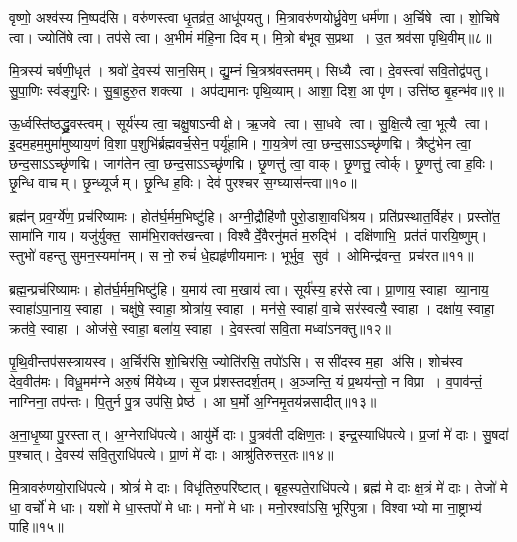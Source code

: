 वृष्णो॒ अश्व॑स्य नि॒ष्पद॑सि। वरु॑णस्त्वा धृ॒तव्र॑त॒ आधू॑पयतु। मि॒त्रावरु॑णयोर्ध्रु॒वेण॒ धर्म॑णा। अ॒र्चिषे त्वा। शो॒चिषे त्वा। ज्योति॑षे त्वा। तप॑से त्वा। अ॒भीमं म॑हि॒ना दिवम्। मि॒त्रो ब॑भूव स॒प्रथा। उ॒त श्रव॑सा पृथि॒वीम्॥८॥

मि॒त्रस्य॑ चर्\mbox{}षणी॒धृत॑। श्रवो॑ दे॒वस्य॑ सान॒सिम्। द्यु॒म्नं चि॒त्रश्र॑वस्तमम्। सिध्यै त्वा। दे॒वस्त्वा॑ सवि॒तोद्व॑पतु। सु॒पा॒णिः स्व॑ङ्गु॒रिः। सु॒बा॒हुरु॒त शक्त्या। अप॑द्यमानः पृथि॒व्याम्। आशा॒ दिश॒ आ पृ॑ण। उत्ति॑ष्ठ बृ॒हन्भ॑व॥९॥

ऊ॒र्ध्वस्ति॑ष्ठद्ध्रु॒वस्त्वम्। सूर्य॑स्य त्वा॒ चक्षु॒षाऽन्वीक्षे। ऋ॒जवे त्वा। सा॒धवे त्वा। सु॒क्षि॒त्यै त्वा॒ भूत्यै त्वा। इ॒दम॒हम॒मुमा॑मुष्याय॒णं  वि॒शा प॒शुभि॑र्ब्रह्मवर्च॒सेन॒ पर्यू॑हामि। गा॒य॒त्रेण॑ त्वा॒ छन्द॒साऽऽच्छृ॑णद्मि। त्रैष्टु॑भेन त्वा॒ छन्द॒साऽऽच्छृ॑णद्मि। जाग॑तेन त्वा॒ छन्द॒साऽऽच्छृ॑णद्मि। छृ॒णत्तु॑ त्वा॒ वाक्। छृ॒णत्तु॒ त्वोर्क्। छृ॒णत्तु॑ त्वा ह॒विः। छृ॒न्धि वाचम्। छृ॒न्ध्यूर्जम्। छृ॒न्धि ह॒विः। देव॑ पुरश्चर स॒ग्घ्यास॑न्त्वा॥१०॥
\anuvakamend[पृ॒थि॒वीं भ॑व॒ वाख्षट्च॑]

ब्रह्म॑न् प्रव॒र्ग्ये॑ण॒ प्रच॑रिष्यामः। होत॑र्घ॒र्मम॒भिष्टु॑हि। अग्नी॒द्रौहि॑णौ पुरो॒डाशा॒वधि॑श्रय। प्रति॑प्रस्थात॒र्विह॑र। प्रस्तो॑त॒ सामा॑नि गाय। यजु॑र्\mbox{}युक्त॒ साम॑भि॒राक्त॑खन्त्वा। विश्वैर्दे॒वैरनु॑मतं म॒रुद्भि॑। दक्षि॑णाभि॒ प्रत॑तं पारयि॒ष्णुम्। स्तुभो॑ वहन्तु सुमन॒स्यमा॑नम्। स नो॒ रुचं॑ धे॒ह्यहृ॑णीयमानः। भूर्भुव॒ सुव॑। ओमिन्द्र॑वन्त॒ प्रच॑रत॥११॥
\anuvakamend[अहृ॑णीयमानो॒ द्वे च॑]

ब्रह्म॒न्प्रच॑रिष्यामः। होत॑र्घ॒र्मम॒भिष्टु॑हि। य॒माय॑ त्वा म॒खाय॑ त्वा। सूर्य॑स्य॒ हर॑से त्वा। प्रा॒णाय॒ स्वाहा व्या॒नाय॒ स्वाहा॑ऽपा॒नाय॒ स्वाहा। चक्षु॑षे॒ स्वाहा॒ श्रोत्रा॑य॒ स्वाहा। मन॑से॒ स्वाहा॑ वा॒चे सर॑स्वत्यै॒ स्वाहा। दक्षा॑य॒ स्वाहा॒ क्रत॑वे॒ स्वाहा। ओज॑से॒ स्वाहा॒ बला॑य॒ स्वाहा। दे॒वस्त्वा॑ सवि॒ता मध्वा॑ऽनक्तु॥१२॥

पृ॒थि॒वीन्तप॑सस्त्रायस्व। अ॒र्चिर॑सि शो॒चिर॑सि॒ ज्योति॑रसि॒ तपो॑ऽसि। ससी॑दस्व म॒हा अ॑सि। शोच॑स्व देव॒वीत॑मः। विधू॒मम॑ग्ने अरु॒षं मि॑येध्य। सृ॒ज प्र॑शस्तदर्\mbox{}श॒तम्। अ॒ञ्जन्ति॒ यं प्र॒थय॑न्तो॒ न विप्रा। व॒पाव॑न्तं॒ नाग्निना॒ तप॑न्तः। पि॒तुर्न पु॒त्र उप॑सि॒ प्रेष्ठ॑। आ घ॒र्मो अ॒ग्निमृ॒तय॑न्नसादीत्॥१३॥

अ॒ना॒धृ॒ष्या पु॒रस्तात्। अ॒ग्नेराधि॑पत्ये। आयु॑र्मे दाः। पु॒त्रव॑ती दक्षिण॒तः। इन्द्र॒स्याधि॑पत्ये। प्र॒जां मे॑ दाः। सु॒षदा॑ प॒श्चात्। दे॒वस्य॑ सवि॒तुराधि॑पत्ये। प्रा॒णं मे॑ दाः। आश्रु॑तिरुत्तर॒तः॥१४॥

मि॒त्रावरु॑णयो॒राधि॑पत्ये। श्रोत्रं॑ मे दाः। विधृ॑तिरु॒परि॑ष्टात्। बृह॒स्पते॒राधि॑पत्ये। ब्रह्म॑ मे दाः क्ष॒त्रं मे॑ दाः। तेजो॑ मे धा॒ वर्चो॑ मे धाः। यशो॑ मे धा॒स्तपो॑ मे धाः। मनो॑ मे धाः। मनो॒रश्वा॑ऽसि॒ भूरि॑पुत्रा। विश्वाभ्यो मा ना॒ष्ट्राभ्य॑ पाहि॥१५॥

